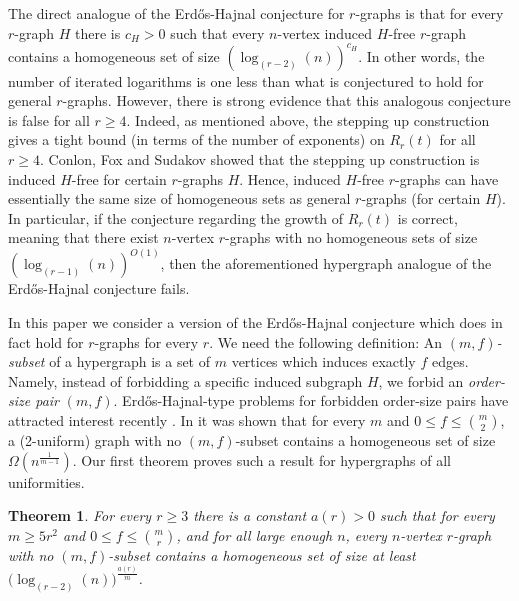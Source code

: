 \documentclass[11pt]{article}
\theoremstyle{plain}
\newtheorem{theorem}{Theorem}[section]
\begin{document}
The direct analogue of the Erd\H{o}s-Hajnal conjecture for $r$-graphs is that for every $r$-graph $H$ there is $c_H > 0$ such that every $n$-vertex induced $H$-free $r$-graph contains a homogeneous set of size $(\log_{(r-2)}(n))^{c_H}$. In other words, the number of iterated logarithms is one less than what is conjectured to hold for general $r$-graphs. However, there is strong evidence that this analogous conjecture is false for all $r \geq 4$. Indeed, as mentioned above, the stepping up construction gives a tight bound (in terms of the number of exponents) on $R_r(t)$ for all $r \geq 4$. 
Conlon, Fox and Sudakov \cite{CFS_hyper} showed that the stepping up construction is induced $H$-free for certain $r$-graphs $H$. 
Hence,
induced $H$-free $r$-graphs can have essentially the same size of homogeneous sets as general $r$-graphs (for certain $H$). In particular, if the conjecture regarding the growth of $R_r(t)$ is correct, meaning that there exist $n$-vertex $r$-graphs with no homogeneous sets of size $(\log_{(r-1)}(n))^{O(1)}$,  
then the aforementioned hypergraph analogue of the Erd\H{o}s-Hajnal conjecture fails.

In this paper we consider a version of the Erd\H{o}s-Hajnal conjecture which does in fact hold for $r$-graphs for every $r$. 
We need the following definition: An {\em $(m,f)$-subset} of a hypergraph is a set of $m$ vertices which induces exactly $f$ edges. 
Namely, instead of forbidding a specific induced subgraph $H$, we forbid an {\em order-size pair} $(m,f)$. 
Erd\H{o}s-Hajnal-type problems for forbidden order-size pairs have attracted interest recently \cite{MS_OrderSizePair,GT,ABGMW}. 
In \cite{ABGMW} it was shown that for every $m$ and $0 \leq f \leq \binom{m}{2}$, a (2-uniform) graph with no $(m,f)$-subset contains a homogeneous set of size $\Omega(n^{\frac{1}{m-1}})$. Our first theorem proves such a result for hypergraphs of all uniformities.

\begin{theorem} \label{main-result-1}
    For every $r \geq 3$ there is a constant $a(r)>0$ such that for every $m \geq 5 r^2$ and $0 \leq f \leq \binom{m}{r}$, and for all large enough $n$, every $n$-vertex $r$-graph with no $(m,f)$-subset contains a homogeneous set of size at least
    $\big(\log_{(r-2)}(n) \big)^{\frac{a(r)}{m}}$. 
\end{theorem}
\end{document}

